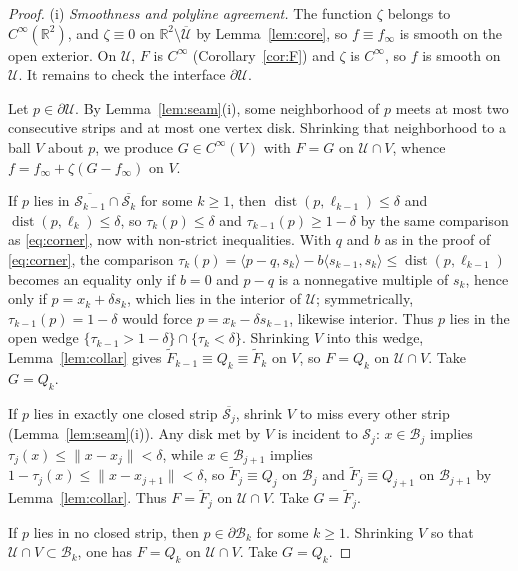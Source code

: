 \documentclass[10pt,a4paper]{amsart}
\newcommand{\R}{\mathbb{R}}
\newcommand{\ip}[2]{\langle #1,#2\rangle}
\begin{document}
\begin{proof}
(i) \emph{Smoothness and polyline agreement.}
The function $\zeta$ belongs to $C^\infty(\R^2)$, and $\zeta\equiv 0$ on $\R^2\setminus\overline{\mathcal U}$ by Lemma~\ref{lem:core}, so $f\equiv f_\infty$ is smooth on the open exterior.
On $\mathcal U$, $F$ is $C^\infty$ (Corollary~\ref{cor:F}) and $\zeta$ is $C^\infty$, so $f$ is smooth on $\mathcal U$.
It remains to check the interface $\partial\mathcal U$.

Let $p\in\partial\mathcal U$. By Lemma~\ref{lem:seam}(i), some neighborhood of $p$ meets at most two consecutive strips and at most one vertex disk. Shrinking that neighborhood to a ball $V$ about $p$, we produce $G\in C^\infty(V)$ with $F=G$ on $\mathcal U\cap V$, whence $f=f_\infty+\zeta(G-f_\infty)$ on $V$.

If $p$ lies in $\overline{\mathcal S_{k-1}}\cap\overline{\mathcal S_k}$ for some $k\ge 1$, then $\operatorname{dist}(p,\ell_{k-1})\le\delta$ and $\operatorname{dist}(p,\ell_k)\le\delta$, so $\tau_k(p)\le\delta$ and $\tau_{k-1}(p)\ge 1-\delta$ by the same comparison as \eqref{eq:corner}, now with non-strict inequalities.
With $q$ and $b$ as in the proof of \eqref{eq:corner}, the comparison $\tau_k(p)=\ip{p-q}{s_k}-b\ip{s_{k-1}}{s_k}\le\operatorname{dist}(p,\ell_{k-1})$ becomes an equality only if $b=0$ and $p-q$ is a nonnegative multiple of $s_k$, hence only if $p=x_k+\delta s_k$, which lies in the interior of $\mathcal U$; symmetrically, $\tau_{k-1}(p)=1-\delta$ would force $p=x_k-\delta s_{k-1}$, likewise interior.
Thus $p$ lies in the open wedge $\{\tau_{k-1}>1-\delta\}\cap\{\tau_k<\delta\}$. Shrinking $V$ into this wedge, Lemma~\ref{lem:collar} gives $\widetilde F_{k-1}\equiv Q_k\equiv\widetilde F_k$ on $V$, so $F=Q_k$ on $\mathcal U\cap V$. Take $G=Q_k$.

If $p$ lies in exactly one closed strip $\overline{\mathcal S_j}$, shrink $V$ to miss every other strip (Lemma~\ref{lem:seam}(i)). Any disk met by $V$ is incident to $\mathcal S_j$: $x\in\mathcal B_j$ implies $\tau_j(x)\le\|x-x_j\|<\delta$, while $x\in\mathcal B_{j+1}$ implies $1-\tau_j(x)\le\|x-x_{j+1}\|<\delta$, so $\widetilde F_j\equiv Q_j$ on $\mathcal B_j$ and $\widetilde F_j\equiv Q_{j+1}$ on $\mathcal B_{j+1}$ by Lemma~\ref{lem:collar}. Thus $F=\widetilde F_j$ on $\mathcal U\cap V$. Take $G=\widetilde F_j$.

If $p$ lies in no closed strip, then $p\in\partial\mathcal B_k$ for some $k\ge 1$. Shrinking $V$ so that $\mathcal U\cap V\subset\mathcal B_k$, one has $F=Q_k$ on $\mathcal U\cap V$. Take $G=Q_k$.


\end{proof}
\end{document}
